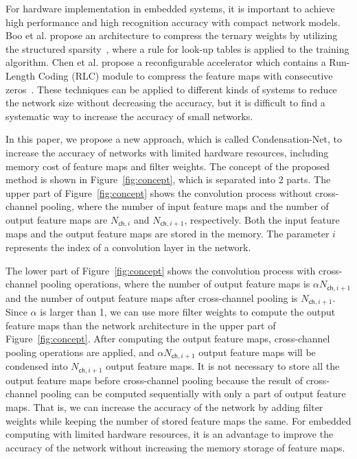 \documentclass[10pt,twocolumn,letterpaper]{article}
\begin{document}
For hardware implementation in embedded systems, it is important to achieve high performance and high recognition accuracy with compact network models. Boo et al. propose an architecture to compress the ternary weights by utilizing the structured sparsity~\cite{Boo17}, where a rule for look-up tables is applied to the training algorithm. Chen et al. propose a reconfigurable accelerator which contains a Run-Length Coding (RLC) module to compress the feature maps with consecutive zeros~\cite{YhChen17}. These techniques can be applied to different kinds of systems to reduce the network size without decreasing the accuracy, but it is difficult to find a systematic way to increase the accuracy of small networks.



In this paper, we propose a new approach, which is called Condensation-Net, to increase the accuracy of networks with limited hardware resources, including memory cost of feature maps and filter weights. The concept of the proposed method is shown in Figure~\ref{fig:concept}, which is separated into 2 parts. The upper part of Figure~\ref{fig:concept} shows the convolution process without cross-channel pooling, where the number of input feature maps and the number of output feature maps are $N_{\mathsf{ch},i}$ and $N_{\mathsf{ch},i+1}$, respectively. Both the input feature maps and the output feature maps are stored in the memory. The parameter $i$ represents the index of a convolution layer in the network. 

The lower part of Figure~\ref{fig:concept} shows the convolution process with cross-channel pooling operations, where the number of output feature maps is $\alpha N_{\mathsf{ch},i+1}$ and the number of output feature maps after cross-channel pooling is $N_{\mathsf{ch},i+1}$. Since $\alpha$ is larger than 1, we can use more filter weights to compute the output feature maps than the network architecture in the upper part of Figure~\ref{fig:concept}. After computing the output feature maps, cross-channel pooling operations are applied, and $\alpha N_{\mathsf{ch},i+1}$ output feature maps will be condensed into $N_{\mathsf{ch},i+1}$ output feature maps. It is not necessary to store all the output feature maps before cross-channel pooling because the result of cross-channel pooling can be computed sequentially with only a part of output feature maps. That is, we can increase the accuracy of the network by adding filter weights while keeping the number of stored feature maps the same. For embedded computing with limited hardware resources, it is an advantage to improve the accuracy of the network without increasing the memory storage of feature maps.
\end{document}
